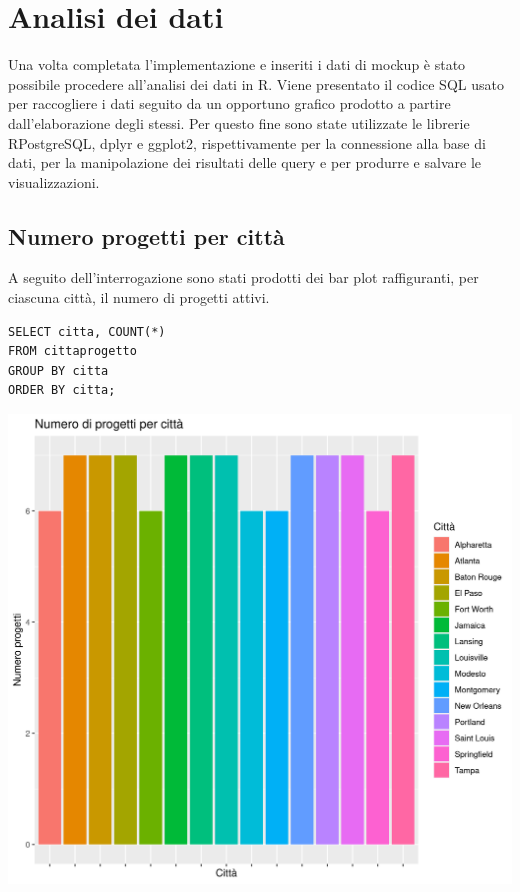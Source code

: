 \documentclass{article}
\begin{document}
\newpage

\section{Analisi dei dati}
Una volta completata l'implementazione e inseriti i dati di mockup è stato possibile procedere all'analisi dei dati in R. Viene presentato il codice SQL usato per raccogliere i dati seguito da un opportuno grafico prodotto a partire dall'elaborazione degli stessi.
\newline
\newline
Per questo fine sono state utilizzate le librerie RPostgreSQL, dplyr e ggplot2, rispettivamente per la connessione alla base di dati, per la manipolazione dei risultati delle query e per produrre e salvare le visualizzazioni.

\subsection{Numero progetti per città}
A seguito dell'interrogazione sono stati prodotti dei bar plot raffiguranti, per ciascuna città, il numero di progetti attivi.
\begin{verbatim}
SELECT citta, COUNT(*) 
FROM cittaprogetto 
GROUP BY citta 
ORDER BY citta;
\end{verbatim}
\begin{center}
\includegraphics[width=\textwidth]{plot_numero_progetti_citta.png}
\end{center}
\end{document}
